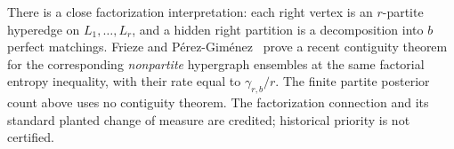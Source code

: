 There is a close factorization interpretation: each right vertex is an
$r$-partite hyperedge on $L_1,\ldots,L_r$, and a hidden right partition
is a decomposition into $b$ perfect matchings. Frieze and
P\'erez-Gim\'enez~\cite{FriezePerez} prove a recent contiguity theorem
for the corresponding \emph{nonpartite} hypergraph ensembles at the
same factorial entropy inequality, with their rate equal to
$\gamma_{r,b}/r$. The finite partite posterior count above uses no
contiguity theorem. The factorization connection and its standard
planted change of measure are credited; historical priority is not
certified.

